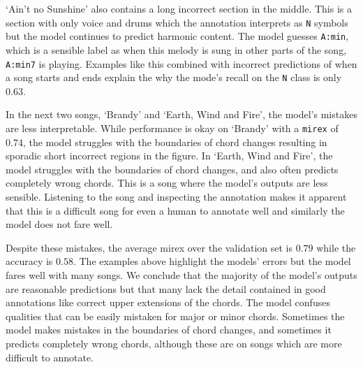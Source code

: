 `Ain't no Sunshine' also contains a long incorrect section in the middle. This is a section with only voice and drums which the annotation interprets as \texttt{N} symbols but the model continues to predict harmonic content. The model guesses \texttt{A:min}, which is a sensible label as when this melody is sung in other parts of the song, \texttt{A:min7} is playing. Examples like this combined with incorrect predictions of when a song starts and ends explain the why the mode's recall on the \texttt{N} class is only $0.63$.

In the next two songs, `Brandy' and `Earth, Wind and Fire', the model's mistakes are less interpretable. While performance is okay on `Brandy' with a \texttt{mirex} of $0.74$, the model struggles with the boundaries of chord changes resulting in sporadic short incorrect regions in the figure. In `Earth, Wind and Fire', the model struggles with the boundaries of chord changes, and also often predicts completely wrong chords. This is a song where the model's outputs are less sensible. Listening to the song and inspecting the annotation makes it apparent that this is a difficult song for even a human to annotate well and similarly the model does not fare well.

Despite these mistakes, the average mirex over the validation set is $0.79$ while the accuracy is $0.58$. The examples above highlight the models' errors but the model fares well with many songs. We conclude that the majority of the model's outputs are reasonable predictions but that many lack the detail contained in good annotations like correct upper extensions of the chords. The model confuses qualities that can be easily mistaken for major or minor chords. Sometimes the model makes mistakes in the boundaries of chord changes, and sometimes it predicts completely wrong chords, although these are on songs which are more difficult to annotate.

